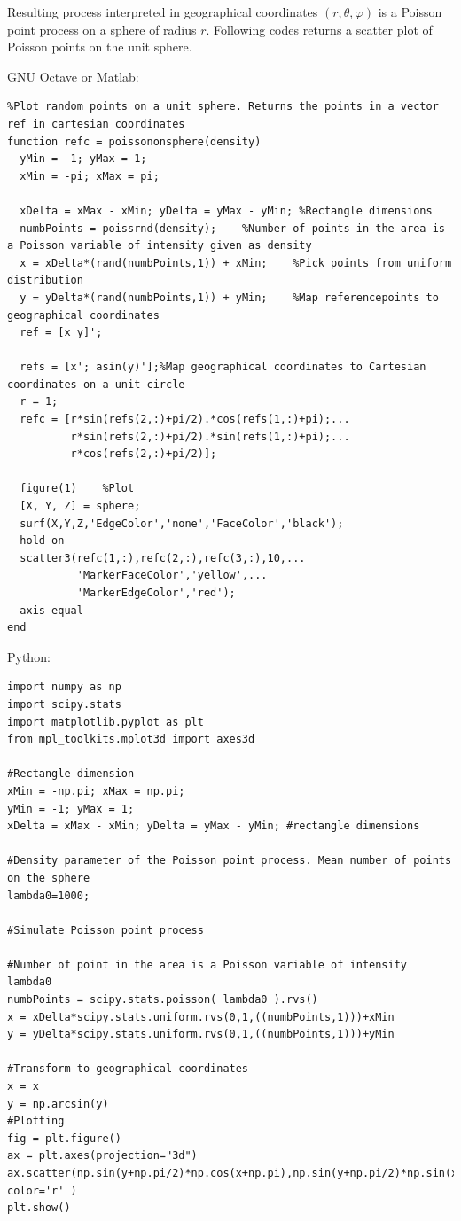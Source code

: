 \documentclass{article}
\begin{document}
        Resulting process interpreted in geographical coordinates $(r,\theta,\varphi)$ is a Poisson point process on a sphere of radius $r$.  Following codes returns a scatter plot of Poisson points on the unit sphere.



        GNU Octave or Matlab:
\begin{verbatim}
%Plot random points on a unit sphere. Returns the points in a vector ref in cartesian coordinates
function refc = poissononsphere(density)
  yMin = -1; yMax = 1;
  xMin = -pi; xMax = pi;
  
  xDelta = xMax - xMin; yDelta = yMax - yMin; %Rectangle dimensions
  numbPoints = poissrnd(density);    %Number of points in the area is a Poisson variable of intensity given as density
  x = xDelta*(rand(numbPoints,1)) + xMin;    %Pick points from uniform distribution
  y = yDelta*(rand(numbPoints,1)) + yMin;    %Map referencepoints to geographical coordinates
  ref = [x y]';

  refs = [x'; asin(y)'];%Map geographical coordinates to Cartesian coordinates on a unit circle
  r = 1;
  refc = [r*sin(refs(2,:)+pi/2).*cos(refs(1,:)+pi);...
          r*sin(refs(2,:)+pi/2).*sin(refs(1,:)+pi);...
          r*cos(refs(2,:)+pi/2)];

  figure(1)    %Plot
  [X, Y, Z] = sphere;
  surf(X,Y,Z,'EdgeColor','none','FaceColor','black');
  hold on
  scatter3(refc(1,:),refc(2,:),refc(3,:),10,...
           'MarkerFaceColor','yellow',...
           'MarkerEdgeColor','red');
  axis equal
end
\end{verbatim}

Python:

\begin{verbatim}
import numpy as np
import scipy.stats
import matplotlib.pyplot as plt
from mpl_toolkits.mplot3d import axes3d

#Rectangle dimension
xMin = -np.pi; xMax = np.pi;
yMin = -1; yMax = 1;
xDelta = xMax - xMin; yDelta = yMax - yMin; #rectangle dimensions

#Density parameter of the Poisson point process. Mean number of points on the sphere
lambda0=1000; 

#Simulate Poisson point process

#Number of point in the area is a Poisson variable of intensity lambda0
numbPoints = scipy.stats.poisson( lambda0 ).rvs()
x = xDelta*scipy.stats.uniform.rvs(0,1,((numbPoints,1)))+xMin
y = yDelta*scipy.stats.uniform.rvs(0,1,((numbPoints,1)))+yMin

#Transform to geographical coordinates
x = x
y = np.arcsin(y)
#Plotting
fig = plt.figure()
ax = plt.axes(projection="3d")
ax.scatter(np.sin(y+np.pi/2)*np.cos(x+np.pi),np.sin(y+np.pi/2)*np.sin(x+np.pi),np.cos(y+np.pi/2), color='r' )
plt.show()

\end{verbatim}
\end{document}
